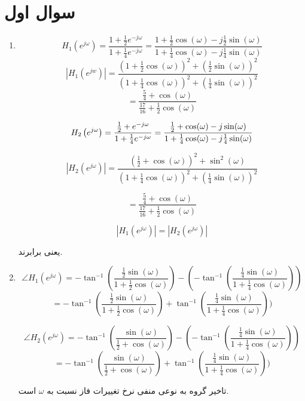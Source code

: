 \documentclass[12pt]{article}
\begin{document}
\KashidaOff

\section{سوال اول}


\begin{enumerate}
	\item
	$$H_1(e^{j\omega}) = \frac{1+\frac{1}{2} e^{-j\omega}}{1+\frac{1}{4} e^{-j\omega}} = \frac{1 + \frac{1}{2} \cos (\omega) - j \frac{1}{2}\sin(\omega)}{1 + \frac{1}{4} \cos(\omega) - j \frac{1}{4} \sin (\omega)}$$
	$$|H_1(e^{jw})| =  \frac{(1 + \frac{1}{2} \cos (\omega))^2 +  (\frac{1}{2}\sin(\omega))^2}{(1 + \frac{1}{4} \cos(\omega))^2 + ( \frac{1}{4} \sin (\omega))^2}$$
	$$=\frac{\frac{5}{4}+ \cos (\omega)}{\frac{17}{16} + \frac{1}{2}\cos (\omega)}$$
	
	
	$$
H_{2}\left(e^{j \omega}\right) =\frac{\frac{1}{2}+e^{-j \omega}}{1+\frac{1}{4} e^{-j \omega}} \\
=\frac{\frac{1}{2}+\cos (\omega)-j \sin (\omega)}{1+\frac{1}{4} \cos (\omega)-j \frac{1}{4} \sin (\omega)}
	$$
	
	$$
	\left|H_{2}\left(e^{j \omega}\right)\right|=\frac{\left(\frac{1}{2}+\cos (\omega)\right)^{2}+\sin ^{2}(\omega)}{\left(1+\frac{1}{4} \cos (\omega)\right)^{2}+\left(\frac{1}{4} \sin (\omega)\right)^{2}}
	$$
	
	$$=\frac{\frac{5}{4}+ \cos (\omega)}{\frac{17}{16} + \frac{1}{2}\cos (\omega)}$$
		
	$$|H_1(e^{j\omega})| = |H_2(e^{j\omega})|$$	
		
		یعنی برابرند.
		
	\item
	
	$$\angle H_1 (e^{j \omega}) = -\tan^{-1} (\frac{\frac{1}{2} \sin (\omega)}{1 + \frac{1}{2} \cos (\omega)}) - (-\tan^{-1} (\frac{\frac{1}{4} \sin (\omega)}{1 + \frac{1}{4} \cos (\omega)}))$$
	$$= -\tan^{-1} (\frac{\frac{1}{2} \sin (\omega)}{1 + \frac{1}{2} \cos (\omega)}) + \tan^{-1} (\frac{\frac{1}{4} \sin (\omega)}{1 + \frac{1}{4} \cos (\omega)}))$$
	
	$$\angle H_2 (e^{j \omega}) = -\tan^{-1} (\frac{ \sin (\omega)}{\frac{1}{2} +  \cos (\omega)}) - (-\tan^{-1} (\frac{\frac{1}{4} \sin (\omega)}{1 + \frac{1}{4} \cos (\omega)}))$$
	$$= -\tan^{-1} (\frac{ \sin (\omega)}{\frac{1}{2} +  \cos (\omega)}) +\tan^{-1} (\frac{\frac{1}{4} \sin (\omega)}{1 + \frac{1}{4} \cos (\omega)}))$$
	
	تاخیر گروه به نوعی منفی نرخ تغییرات فاز نسبت به $\omega$ است.
	

\end{enumerate}
\end{document}
